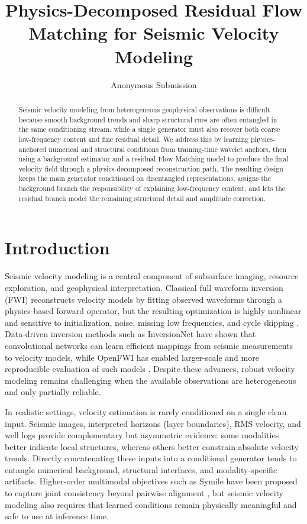 \documentclass[letterpaper]{article}
\title{Physics-Decomposed Residual Flow Matching for Seismic Velocity Modeling}
\author{
Anonymous Submission
}
\begin{document}
\maketitle

\begin{abstract}
Seismic velocity modeling from heterogeneous geophysical observations is difficult because smooth background trends and sharp structural cues are often entangled in the same conditioning stream, while a single generator must also recover both coarse low-frequency content and fine residual detail. We address this by learning physics-anchored numerical and structural conditions from training-time wavelet anchors, then using a background estimator and a residual Flow Matching model to produce the final velocity field through a physics-decomposed reconstruction path. The resulting design keeps the main generator conditioned on disentangled representations, assigns the background branch the responsibility of explaining low-frequency content, and lets the residual branch model the remaining structural detail and amplitude correction.
\end{abstract}

\section{Introduction}
Seismic velocity modeling is a central component of subsurface imaging, resource exploration, and geophysical interpretation. Classical full waveform inversion (FWI) reconstructs velocity models by fitting observed waveforms through a physics-based forward operator, but the resulting optimization is highly nonlinear and sensitive to initialization, noise, missing low frequencies, and cycle skipping \citep{virieux2009overview}. Data-driven inversion methods such as InversionNet have shown that convolutional networks can learn efficient mappings from seismic measurements to velocity models, while OpenFWI has enabled larger-scale and more reproducible evaluation of such models \citep{wu2020inversionnet,deng2022openfwi}. Despite these advances, robust velocity modeling remains challenging when the available observations are heterogeneous and only partially reliable.

In realistic settings, velocity estimation is rarely conditioned on a single clean input. Seismic images, interpreted horizons (layer boundaries), RMS velocity, and well logs provide complementary but asymmetric evidence: some modalities better indicate local structures, whereas others better constrain absolute velocity trends. Directly concatenating these inputs into a conditional generator tends to entangle numerical background, structural interfaces, and modality-specific artifacts. Higher-order multimodal objectives such as Symile have been proposed to capture joint consistency beyond pairwise alignment \citep{saporta2024symile}, but seismic velocity modeling also requires that learned conditions remain physically meaningful and safe to use at inference time.
\end{document}
